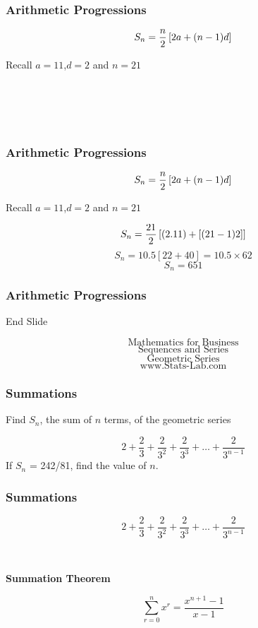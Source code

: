\documentclass{beamer}
\begin{document}
\begin{frame}
\frametitle{Arithmetic Progressions}
\Large
\vspace{-0.8cm}
\[ S_n  = {n \over 2} \left[ 2a+(n-1)d \right] \]

Recall $a=11$,$d=2$ and $n=21$


\[ \phantom{S_n  = {21 \over 2} \left[ (2.11) +[(21-1)2] \right]} \]
\[ \phantom{S_n  = 10.5 \left[ 22 + 40 \right]  = 10.5 \times 62}\]
\[ \phantom{S_n  = 651} \] 
\end{frame}

\begin{frame}
\frametitle{Arithmetic Progressions}
\Large
\vspace{-0.8cm}
\[ S_n  = {n \over 2} \left[ 2a+(n-1)d \right] \]

Recall $a=11$,$d=2$ and $n=21$


\[ S_n  = {21 \over 2} \left[ (2.11) +[(21-1)2] \right] \]
\[ S_n  = 10.5 \left[ 22 + 40 \right]  = 10.5 \times 62\]
\[ S_n  = 651 \] 
\end{frame}

\begin{frame}
\frametitle{Arithmetic Progressions}
\Large
End Slide
\end{frame}

\begin{frame}
\huge
\[ \mbox{ Mathematics for Business  }  \]
\LARGE
\[ \mbox{ Sequences and Series  }  \]
\[ \mbox{ Geometric Series   }  \]
\Large
\[ \mbox{ www.Stats-Lab.com
  }  \]
\end{frame}

\begin{frame}
\frametitle{Summations}
\Large
\vspace{-2cm}
Find $S_n$, the sum of $n$ terms, of the geometric series

\[  2 + \frac{2}{3} + \frac{2}{3^2} + \frac{2}{3^3} +  \ldots + \frac{2}{3^{n-1}} \]
\bigskip
If $S_n$ = 242/81, find the value of $n$.

\end{frame}

\begin{frame}
\frametitle{Summations}
\Large
\vspace{-0.5cm}
\[  2 + \frac{2}{3} + \frac{2}{3^2} + \frac{2}{3^3} +  \ldots + \frac{2}{3^{n-1}} \]
\[ \phantom{ 2 \times \left[ 1 + \frac{1}{3} + \frac{1}{3^2} + \frac{1}{3^3} +  \ldots + \frac{1}{3^{n-1}}   \right]  } \]


\textbf{Summation Theorem}

\[ \sum^{n}_{r=0} x^r = \frac{x^{n+1}-1}{x-1} \]
\[ \phantom{k \sum^{n}_{r=0} x^r = k \frac{x^{n+1}-1}{x-1}  } \]
\phantom{Here $k=2$ and $x = 1/3$ }


\end{frame}
\end{document}
